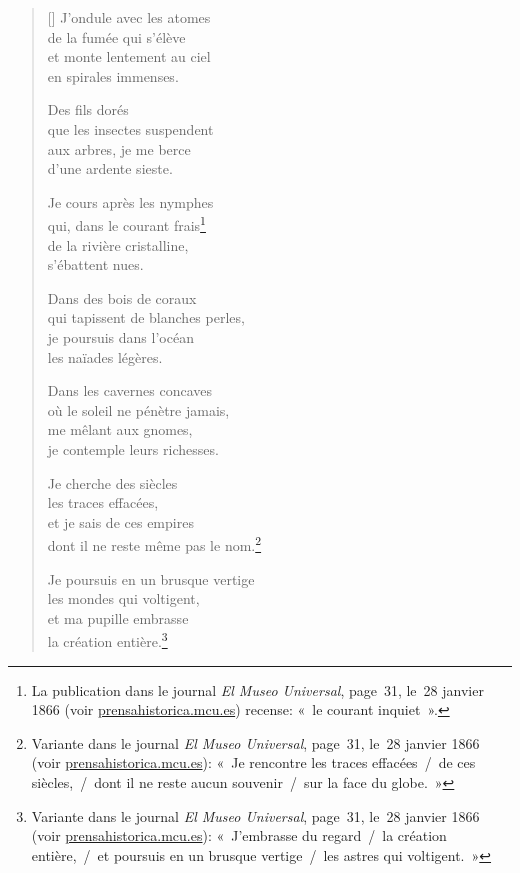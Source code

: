 \documentclass[a4paper,12pt]{book}
\begin{document}
\begin{verse}[\versewidth]
  J'ondule avec les atomes \\
  de la fumée qui s'élève \\
  et monte lentement au ciel \\
  en spirales immenses.

  Des fils dorés \\
  que les insectes suspendent \\
  aux arbres, je me berce \\
  d'une ardente sieste.

  Je cours après les nymphes \\
  qui, dans le courant frais\footnote{La publication dans
le journal \emph{El Museo Universal}, page~31, le~28 janvier 1866
(voir \url{prensahistorica.mcu.es}) recense: «~le courant inquiet~».} \\
  de la rivière cristalline, \\
  s'ébattent nues.

  Dans des bois de coraux \\
  qui tapissent de blanches perles, \\
  je poursuis dans l'océan \\
  les naïades légères.

  Dans les cavernes concaves \\
  où le soleil ne pénètre jamais, \\
  me mêlant aux gnomes, \\
  je contemple leurs richesses.

  Je cherche des siècles \\
  les traces effacées, \\
  et je sais de ces empires \\
  dont il ne reste même pas le nom.\footnote{Variante dans le journal
  \emph{El Museo Universal}, page~31, le~28 janvier 1866 (voir
  \url{prensahistorica.mcu.es}): «~Je rencontre les traces effacées~/~de ces siècles,~/~dont il ne reste aucun souvenir~/~sur la face du globe.~»}

  Je poursuis en un brusque vertige \\
  les mondes qui voltigent, \\
  et ma pupille embrasse \\
  la création entière.\footnote{Variante dans le journal
  \emph{El Museo Universal}, page~31, le~28 janvier 1866 (voir
  \url{prensahistorica.mcu.es}): «~J'embrasse du regard~/~la création
  entière,~/~et poursuis en un brusque vertige~/~les astres qui voltigent.~»}


\end{verse}
\end{document}
